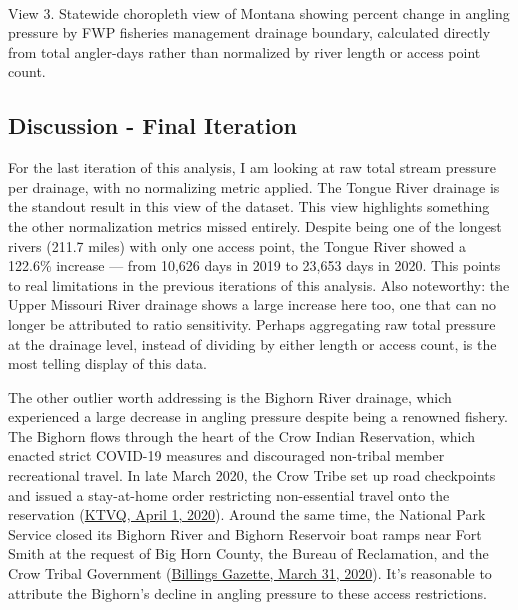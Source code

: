 \documentclass[11pt]{article}
\begin{document}
    \begin{center}
    \end{center}
    { \hspace*{\fill} \\}
    
    View 3. Statewide choropleth view of Montana showing percent change in
angling pressure by FWP fisheries management drainage boundary,
calculated directly from total angler-days rather than normalized by
river length or access point count.

    \hypertarget{discussion---final-iteration}{%
\subsection{Discussion - Final
Iteration}\label{discussion---final-iteration}}

For the last iteration of this analysis, I am looking at raw total
stream pressure per drainage, with no normalizing metric applied. The
Tongue River drainage is the standout result in this view of the
dataset. This view highlights something the other normalization metrics
missed entirely. Despite being one of the longest rivers (211.7 miles)
with only one access point, the Tongue River showed a 122.6\% increase
--- from 10,626 days in 2019 to 23,653 days in 2020. This points to real
limitations in the previous iterations of this analysis. Also
noteworthy: the Upper Missouri River drainage shows a large increase
here too, one that can no longer be attributed to ratio sensitivity.
Perhaps aggregating raw total pressure at the drainage level, instead of
dividing by either length or access count, is the most telling display
of this data.

The other outlier worth addressing is the Bighorn River drainage, which
experienced a large decrease in angling pressure despite being a
renowned fishery. The Bighorn flows through the heart of the Crow Indian
Reservation, which enacted strict COVID-19 measures and discouraged
non-tribal member recreational travel. In late March 2020, the Crow
Tribe set up road checkpoints and issued a stay-at-home order
restricting non-essential travel onto the reservation
(\href{https://www.ktvq.com/news/coronavirus/crow-tribe-puts-up-road-side-checkpoints-to-curb-travel-to-reservation}{KTVQ,
April 1, 2020}). Around the same time, the National Park Service closed
its Bighorn River and Bighorn Reservoir boat ramps near Fort Smith at
the request of Big Horn County, the Bureau of Reclamation, and the Crow
Tribal Government
(\href{https://billingsgazette.com/lifestyles/recreation/bighorn-canyon-nra-closes-boat-ramps-on-bighorn-river-reservoir/article_71a7dc8c-de96-5059-bf44-3be6ebf91879.html}{Billings
Gazette, March 31, 2020}). It's reasonable to attribute the Bighorn's
decline in angling pressure to these access restrictions.
\end{document}
